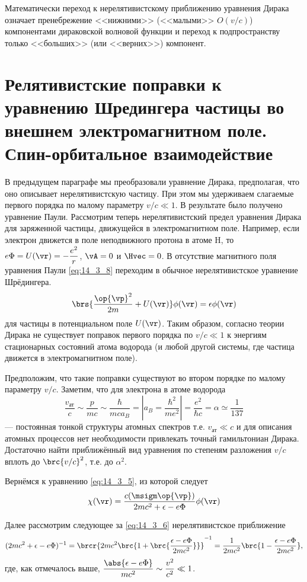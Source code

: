 Математически переход к нерелятивистскому приближению уравнения Дирака означает пренебрежение <<нижними>> (<<малыми>> $O(v/c)$) компонентами дираковской волновой функции и переход к подпространству только <<больших>> (или <<верних>>) компонент.

\section{Релятивистские поправки к уравнению Шредингера частицы во внешнем электромагнитном поле. Спин-орбитальное взаимодействие}

В предыдущем параграфе мы преобразовали уравнение Дирака, предполагая, что оно описывает нерелятивистскую частицу. При этом мы удерживаем слагаемые первого порядка по малому параметру $v/c \ll 1$. В результате было получено уравнение Паули. Рассмотрим теперь нерелятивистский предел уравнения Дирака для заряженной частицы, движущейся в электромагнитном поле. Например, если электрон движется в поле неподвижного протона в атоме H, то $e\Phi = U(\vr) = -\dfrac{e^2}{r}$, $\vA = 0$ и $\Hvec = 0$. В отсутствие магнитного поля уравнения Паули \eqref{eq:14_3_8} переходим в обычное нерелятивистское уравнение Шрёдингера.
$$
\brs{\frac{\op{\vp}^2}{2m} + U(\vr)}\phi(\vr)=\epsilon \phi(\vr)
$$
для частицы в потенциальном поле $U(\vr)$. Таким образом, согласно теории Дирака не существует поправок первого порядка по $v/c \ll 1$ к энергиям стационарных состояний атома водорода (и любой другой системы, где частица движется в электромагнитном поле).

Предположим, что такие поправки существуют во втором порядке по малому параметру $v/c$. Заметим, что для электрона в атоме водорода
$$
\frac{v_{\text{ат}}}{c} \sim \frac{p}{mc} \sim \frac{\hbar}{m c a_B} = \left | a_B = \frac{\hbar^2}{m e^2}\right | = \frac{e^2}{\hbar c} = \alpha \simeq \frac{1}{137}
$$
--- постоянная тонкой структуры атомных спектров т.е. $v_{\text{ат}} \ll c$ и для описания атомных процессов нет необходимости привлекать точный гамильтониан Дирака. Достаточно найти приближённый вид уравнения по степеням разложения $v/c$ вплоть до $\brc{v/c}^2$, т.е. до $\alpha^2$.

Вернёмся к уравнению \eqref{eq:14_3_5}, из которой следует
\begin{equation}
\label{eq:14_4_1}
\chi(\vr) = \frac{c(\msigm \op{\vp})}{2mc^2 + \epsilon - e\Phi} \phi(\vr) 
\end{equation}

Далее рассмотрим следующее за \eqref{eq:14_3_6} нерелятивистское приближение
$$
(2mc^2 + \epsilon - e\Phi)^{-1} = \brcr{2mc^2 \brc{1 + \brc{\frac{\epsilon - e\Phi}{2mc^2}}}}^{-1} = \frac{1}{2mc^2} \brc{1 - \frac{\epsilon - e\Phi}{2mc^2}},
$$
где, как отмечалось выше, $\dfrac{\abs{\epsilon - e\Phi}}{mc^2} \sim \dfrac{v^2}{c^2} \ll 1$.

